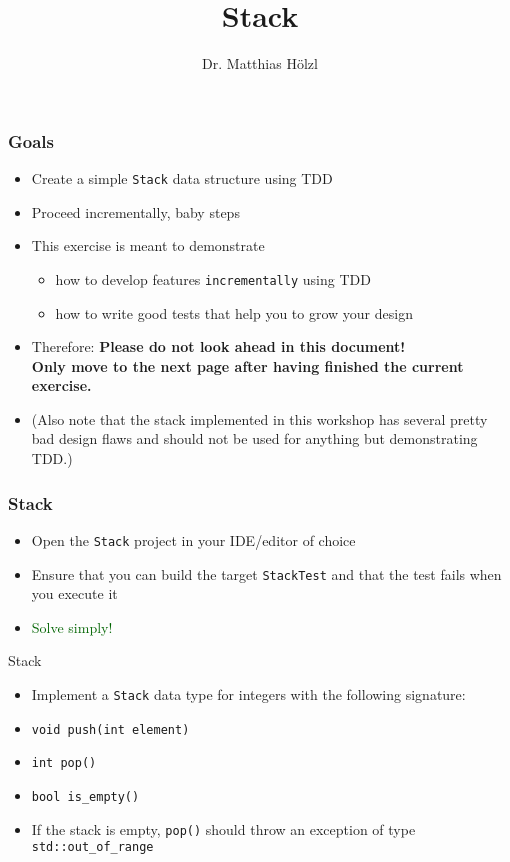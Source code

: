 \documentclass[10pt,aspectratio=169]{beamer}
\author{Dr. Matthias Hölzl}
\begin{document}
\title[Stack]{%
  Stack}

\begin{frame}
  \maketitle
\end{frame}

\begin{frame}[fragile]
  \frametitle{Goals}
  \begin{itemize}
  \item Create a simple \texttt{Stack} data structure using TDD
  \item Proceed incrementally, baby steps\\[1ex]
  
  \item This exercise is meant to demonstrate
    \begin{itemize}
    \item how to develop features \texttt{incrementally} using TDD
    \item how to write good tests that help you to grow your design 
    \end{itemize}
  \item Therefore: \textbf{Please do not look ahead in this document!\\
      Only move to the next page after having finished the current
      exercise.}
  \item (Also note that the stack implemented in this workshop has several
    pretty bad design flaws and should not be used for anything but
    demonstrating TDD.)
  \end{itemize}
\end{frame}


\begin{frame}[fragile]
  \frametitle{Stack}
  \begin{itemize}
  \item Open the \texttt{Stack} project in your IDE/editor of choice
  \item Ensure that you can build the target \texttt{StackTest} and
    that the test fails when you execute it
  \end{itemize}
  \bigskip
  \begin{itemize}
  \item \textcolor{darkgreen}{Solve simply!}
  \end{itemize}
\end{frame}

\begin{frame}[fragile]{Stack}
\begin{itemize}
\item Implement a \texttt{Stack} data type for integers with the
  following signature:
\item \texttt{void push(int element)}
\item \texttt{int pop()}
\item \verb!bool is_empty()!
\item If the stack is empty, \texttt{pop()} should throw an exception
  of type \verb!std::out_of_range!
\end{itemize}
\end{frame}
\end{document}
